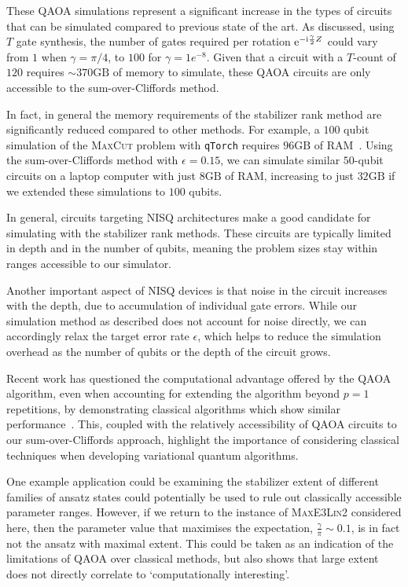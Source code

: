These QAOA simulations represent a significant increase in the types of circuits that can be simulated compared to previous state of the art. As discussed, using $T$ gate synthesis, the number of gates required per rotation $\mathrm{e}^{-\mathrm{i}\frac{\gamma}{2}Z}$ could vary from $1$ when $\gamma=\pi/4$, to $100$ for $\gamma=1e^{-8}$. Given that a circuit with a $T$-count of $120$ requires $\sim 370\mathrm{GB}$ of memory to simulate, these QAOA circuits are only accessible to the sum-over-Cliffords method.\par
In fact, in general the memory requirements of the stabilizer rank method are significantly reduced compared to other methods. For example, a $100$ qubit simulation of the \textsc{MaxCut} problem with \texttt{qTorch} requires $96\mathrm{GB}$ of RAM~\cite{SchuylerFried2017}. Using the sum-over-Cliffords method with $\epsilon=0.15$, we can simulate similar $50$-qubit circuits on a laptop computer with just $8\mathrm{GB}$ of RAM, increasing to just $32\mathrm{GB}$ if we extended these simulations to $100$ qubits.\par
In general, circuits targeting NISQ architectures make a good candidate for simulating with the stabilizer rank methods. These circuits are typically limited in depth and in the number of qubits, meaning the problem sizes stay within ranges accessible to our simulator.\par
Another important aspect of NISQ devices is that noise in the circuit increases with the depth, due to accumulation of individual gate errors. While our simulation method as described does not account for noise directly, we can accordingly relax the target error rate $\epsilon$, which helps to reduce the simulation overhead as the number of qubits or the depth of the circuit grows.\par
Recent work has questioned the computational advantage offered by the QAOA algorithm, even when accounting for extending the algorithm beyond $p=1$ repetitions, by demonstrating classical algorithms which show similar performance~\cite{Hastings2019}. This, coupled with the relatively accessibility of QAOA circuits to our sum-over-Cliffords approach, highlight the importance of considering classical techniques when developing variational quantum algorithms.\par
One example application could be examining the stabilizer extent of different families of ansatz states could potentially be used to rule out classically accessible parameter ranges. However, if we return to the instance of \textsc{MaxE3Lin2} considered here, then the parameter value that maximises the expectation, $\frac{\gamma}{\pi}\sim 0.1$, is in fact not the ansatz with maximal extent. This could be taken as an indication of the limitations of QAOA over classical methods, but also shows that large extent does not directly correlate to `computationally interesting'.
